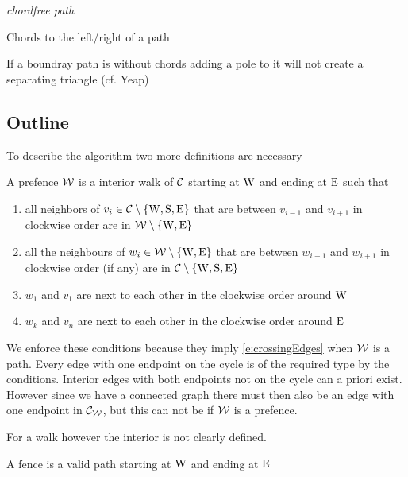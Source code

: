 \emph{chordfree path}

Chords to the left/right of a path

\begin{lemma}
If a boundray path is without chords adding a pole to it will not create a separating triangle (cf. Yeap)
\end{lemma}



\subsection{Outline}
To describe the algorithm two more definitions are necessary

\begin{defi}[prefence]
A prefence $\mathcal{W}$ is a interior walk of $\mathcal{C}$ starting at $\mathrm{W}$ and ending at $\mathrm{E}$ such that
\begin{enumerate}
 \renewcommand*{\labelenumi}{(P\arabic{enumi})}%
 \renewcommand*{\theenumi}{(P\arabic{enumi})}%
  \item  all neighbors of $v_i \in \mathcal{C} \setminus \left\lbrace {\mathrm{W}, \mathrm{S}, \mathrm{E}} \right\rbrace$ that are between $v_{i-1}$ and $v_{i+1}$ in clockwise order are in $\mathcal{W} \setminus \left\lbrace {\mathrm{W}, \mathrm{E}} \right\rbrace$
  \label{p:C}
  \item all the neighbours of $w_i \in \mathcal{W} \setminus \left\lbrace {\mathrm{W}, \mathrm{E}} \right\rbrace$ that are between $w_{i-1}$ and $w_{i+1}$ in clockwise order (if any) are in $\mathcal{C} \setminus \left\lbrace {\mathrm{W}, \mathrm{S}, \mathrm{E}} \right\rbrace$
  \label{p:W}
  \item $w_1$ and $v_1$ are next to each other in the clockwise order around $\mathrm{W}$
  \label{p:pW}
  \item $w_k$ and $v_n$ are next to each other in the clockwise order around  $\mathrm{E}$
  \label{p:pE}
\end{enumerate}
\end{defi}


We enforce these conditions because they imply \ref{e:crossingEdges} when $\mathcal{W}$ is a path. Every edge with one endpoint on the cycle is of the required type by the conditions. Interior edges with both endpoints not on the cycle can a priori exist. However since we have a connected graph there must then also be an edge with  one endpoint in $\mathcal{C}_{\mathcal{W}}$, but this can not be if $\mathcal{W}$ is a prefence.

For a walk however the interior is not clearly defined.

\begin{defi}[fence]
A fence is a valid path starting at $\mathrm{W}$ and ending at $\mathrm{E}$
\end{defi}


